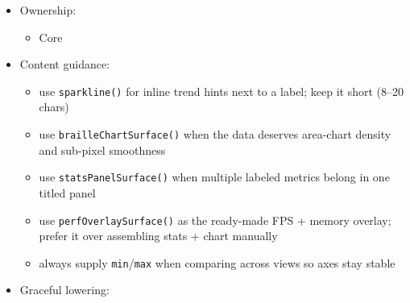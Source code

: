 \begin{itemize}
  \begin{itemize}
  \tightlist
  \item
    exact numeric precision matters more than shape --- use \texttt{t\allowbreak{}a\allowbreak{}b\allowbreak{}l\allowbreak{}e\allowbreak{}(\allowbreak{})} instead
  \item
    the data is categorical rather than continuous --- use \texttt{t\allowbreak{}a\allowbreak{}b\allowbreak{}l\allowbreak{}e\allowbreak{}(\allowbreak{})} or \texttt{t\allowbreak{}r\allowbreak{}e\allowbreak{}e\allowbreak{}(\allowbreak{})}
  \item
    the visualization would be decorative rather than informative
  \end{itemize}
\item
  Ownership:

  \begin{itemize}
  \tightlist
  \item
    Core
  \end{itemize}
\item
  Content guidance:

  \begin{itemize}
  \tightlist
  \item
    use \texttt{s\allowbreak{}p\allowbreak{}a\allowbreak{}r\allowbreak{}k\allowbreak{}l\allowbreak{}i\allowbreak{}n\allowbreak{}e\allowbreak{}(\allowbreak{})} for inline trend hints next to a label; keep it short (8--20 chars)
  \item
    use \texttt{b\allowbreak{}r\allowbreak{}a\allowbreak{}i\allowbreak{}l\allowbreak{}l\allowbreak{}e\allowbreak{}C\allowbreak{}h\allowbreak{}a\allowbreak{}r\allowbreak{}t\allowbreak{}S\allowbreak{}u\allowbreak{}r\allowbreak{}f\allowbreak{}a\allowbreak{}c\allowbreak{}e\allowbreak{}(\allowbreak{})} when the data deserves area-chart density and sub-pixel smoothness
  \item
    use \texttt{s\allowbreak{}t\allowbreak{}a\allowbreak{}t\allowbreak{}s\allowbreak{}P\allowbreak{}a\allowbreak{}n\allowbreak{}e\allowbreak{}l\allowbreak{}S\allowbreak{}u\allowbreak{}r\allowbreak{}f\allowbreak{}a\allowbreak{}c\allowbreak{}e\allowbreak{}(\allowbreak{})} when multiple labeled metrics belong in one titled panel
  \item
    use \texttt{p\allowbreak{}e\allowbreak{}r\allowbreak{}f\allowbreak{}O\allowbreak{}v\allowbreak{}e\allowbreak{}r\allowbreak{}l\allowbreak{}a\allowbreak{}y\allowbreak{}S\allowbreak{}u\allowbreak{}r\allowbreak{}f\allowbreak{}a\allowbreak{}c\allowbreak{}e\allowbreak{}(\allowbreak{})} as the ready-made FPS + memory overlay; prefer it over assembling stats + chart manually
  \item
    always supply \texttt{m\allowbreak{}i\allowbreak{}n}/\texttt{m\allowbreak{}a\allowbreak{}x} when comparing across views so axes stay stable
  \end{itemize}
\item
  Graceful lowering:


\end{itemize}
